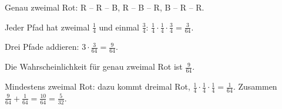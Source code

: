 \documentclass[11pt]{article}
\begin{document}
\noindent\begin{minipage}[t]{0.6\linewidth}\vspace{0pt}\par\noindent{}Genau zweimal Rot: R – R – B, R – B – R, B – R – R.\par\smallskip\par\noindent{}Jeder Pfad hat zweimal $\frac{1}{4}$ und einmal $\frac{3}{4}$: $\frac{1}{4} \cdot \frac{1}{4} \cdot \frac{3}{4} = \frac{3}{64}$.\par\smallskip\par\noindent{}Drei Pfade addieren: $3 \cdot \frac{3}{64} = \frac{9}{64}$.\par\smallskip\par\noindent{}Die Wahrscheinlichkeit für genau zweimal Rot ist $\frac{9}{64}$.\par\smallskip\par\noindent{}Mindestens zweimal Rot: dazu kommt dreimal Rot, $\frac{1}{4} \cdot \frac{1}{4} \cdot \frac{1}{4} = \frac{1}{64}$. Zusammen $\frac{9}{64} + \frac{1}{64} = \frac{10}{64} = \frac{5}{32}$.\par\smallskip\end{minipage}\hfill
\end{document}
